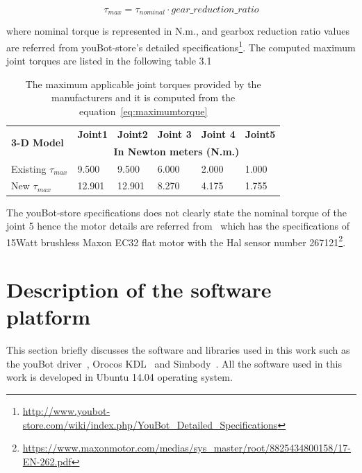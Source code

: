 \begin{equation}
\tau_{max} = \tau_{nominal} \cdot gear\_reduction\_ratio
\label{eq:maximumtorque}
\end{equation}

where nominal torque is represented in N.m., and gearbox reduction ratio values are referred from youBot-store's detailed specifications\footnote{\url{http://www.youbot-store.com/wiki/index.php/YouBot_Detailed_Specifications}}. The computed maximum joint torques are listed in the following table 3.1

\begin{table}[h]
\begin{tabular}{|l|l|l|l|l|l|}
\hline
\multirow{2}{*}{\textbf{3-D Model}} & \textbf{Joint1} & \textbf{Joint2} & \textbf{Joint 3} & \textbf{Joint 4} & \multicolumn{1}{c|}{\textbf{Joint5}} \\ \cline{2-6} 
                                    & \multicolumn{5}{c|}{\textbf{In Newton meters (N.m.)}}                                                           \\ \hline
Existing $\tau_{max}$                     & 9.500           & 9.500           & 6.000            & 2.000            & 1.000                                \\ \hline
New $\tau_{max}$                      & 12.901          & 12.901          & 8.270            & 4.175            & 1.755                                \\ \hline
\end{tabular}
\caption{The maximum applicable joint torques provided by the manufacturers and it is computed from the equation~\eqref{eq:maximumtorque}}
\end{table}

The youBot-store specifications does not clearly state the nominal torque of the joint 5 hence the motor details are referred from~\cite{corberan2012haptic} which has the specifications of 15Watt brushless Maxon EC32 flat motor with the Hal sensor number 267121\footnote{\url{https://www.maxonmotor.com/medias/sys_master/root/8825434800158/17-EN-262.pdf}}.

\newpage
\section{Description of the software platform}

This section briefly discusses the software and libraries used in this work such as the youBot driver~\cite{youbotdriver}, Orocos KDL~\cite{smits2011kdl} and Simbody~\cite{sherman2011simbody}. All the software used in this work is developed in Ubuntu 14.04 operating system.

